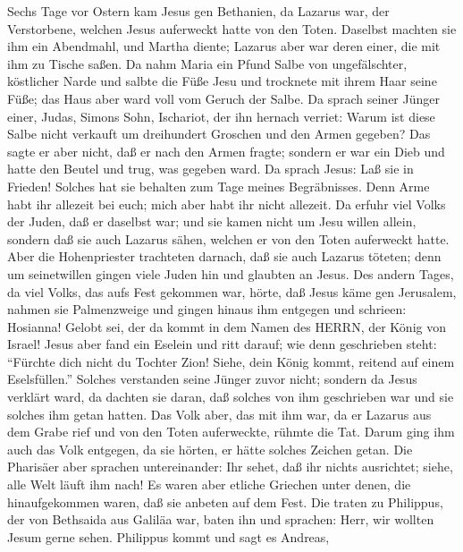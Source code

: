  Sechs Tage vor Ostern kam Jesus gen Bethanien, da Lazarus
war, der Verstorbene, welchen Jesus auferweckt hatte von den Toten.
 Daselbst machten sie ihm ein Abendmahl, und Martha diente;
Lazarus aber war deren einer, die mit ihm zu Tische saßen. 
Da nahm Maria ein Pfund Salbe von ungefälschter, köstlicher Narde und
salbte die Füße Jesu und trocknete mit ihrem Haar seine Füße; das Haus
aber ward voll vom Geruch der Salbe.  Da sprach seiner
Jünger einer, Judas, Simons Sohn, Ischariot, der ihn hernach verriet:
 Warum ist diese Salbe nicht verkauft um dreihundert
Groschen und den Armen gegeben?  Das sagte er aber nicht,
daß er nach den Armen fragte; sondern er war ein Dieb und hatte den
Beutel und trug, was gegeben ward.  Da sprach Jesus: Laß sie
in Frieden! Solches hat sie behalten zum Tage meines Begräbnisses.
 Denn Arme habt ihr allezeit bei euch; mich aber habt ihr
nicht allezeit.  Da erfuhr viel Volks der Juden, daß er
daselbst war; und sie kamen nicht um Jesu willen allein, sondern daß sie
auch Lazarus sähen, welchen er von den Toten auferweckt hatte.
 Aber die Hohenpriester trachteten darnach, daß sie auch
Lazarus töteten;  denn um seinetwillen gingen viele Juden
hin und glaubten an Jesus.  Des andern Tages, da viel
Volks, das aufs Fest gekommen war, hörte, daß Jesus käme gen Jerusalem,
 nahmen sie Palmenzweige und gingen hinaus ihm entgegen und
schrieen: Hosianna! Gelobt sei, der da kommt in dem Namen des HERRN, der
König von Israel!  Jesus aber fand ein Eselein und ritt
darauf; wie denn geschrieben steht:  ``Fürchte dich nicht
du Tochter Zion! Siehe, dein König kommt, reitend auf einem
Eselsfüllen.''  Solches verstanden seine Jünger zuvor
nicht; sondern da Jesus verklärt ward, da dachten sie daran, daß solches
von ihm geschrieben war und sie solches ihm getan hatten. 
Das Volk aber, das mit ihm war, da er Lazarus aus dem Grabe rief und von
den Toten auferweckte, rühmte die Tat.  Darum ging ihm auch
das Volk entgegen, da sie hörten, er hätte solches Zeichen getan.
 Die Pharisäer aber sprachen untereinander: Ihr sehet, daß
ihr nichts ausrichtet; siehe, alle Welt läuft ihm nach!  Es
waren aber etliche Griechen unter denen, die hinaufgekommen waren, daß
sie anbeten auf dem Fest.  Die traten zu Philippus, der von
Bethsaida aus Galiläa war, baten ihn und sprachen: Herr, wir wollten
Jesum gerne sehen.  Philippus kommt und sagt es Andreas,
